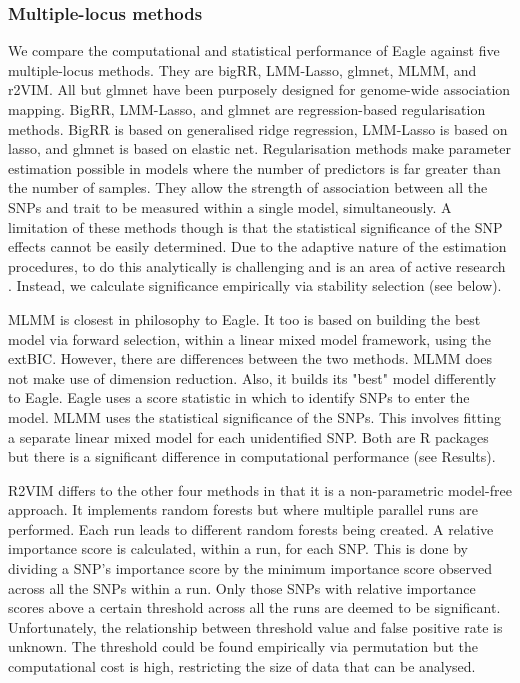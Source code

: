 \documentclass{nature}
\begin{document}
\subsubsection*{Multiple-locus methods}

We compare the computational and statistical performance of Eagle against five multiple-locus methods. They are bigRR, LMM-Lasso, glmnet, 
MLMM, and r2VIM.  All but glmnet have been purposely designed for genome-wide association mapping. 
BigRR, LMM-Lasso, and glmnet are regression-based regularisation 
methods. BigRR is based on generalised ridge regression, LMM-Lasso is based on lasso, and glmnet is based on elastic net. 
Regularisation methods make parameter estimation possible in models  where the number of predictors is far greater than the number of samples. 
They allow the strength of association between all the SNPs and trait to be measured within a single model, simultaneously. 
A limitation of these methods though is that the statistical significance of the SNP effects cannot be easily determined. 
 Due to the adaptive nature of the estimation procedures, to do this 
analytically is challenging and is an area of active research \cite{lockhart2014significance}. Instead, we calculate significance empirically via 
stability selection (see below). 

MLMM is closest in philosophy to Eagle. It too is based on building the best model via forward selection, 
within  a linear mixed model framework, using the 
extBIC. However, there are differences between the two methods.  MLMM does not make use of dimension reduction. Also, it builds its "best" 
model differently to Eagle.  Eagle uses a score statistic in which to identify SNPs to enter the model.
MLMM uses the statistical significance of the SNPs. This involves fitting a separate linear mixed model for each unidentified SNP. 
Both are R packages but there is a significant difference in computational performance (see Results). 
  
R2VIM differs to the other four methods in that it is a non-parametric model-free approach. It implements  
random forests but where multiple parallel runs are performed. Each run leads to 
different random forests being created.  A relative importance score is calculated, within a run,  for each SNP. This is done by dividing a SNP's 
importance score by the minimum importance score observed across all the SNPs within a run. 
Only those SNPs with relative importance scores above a certain threshold across all the runs are deemed to be significant. 
Unfortunately, the relationship between threshold value and false positive rate is unknown. The threshold could be found empirically via permutation 
but the computational cost is high, restricting the size of data that can be analysed. 
\end{document}
